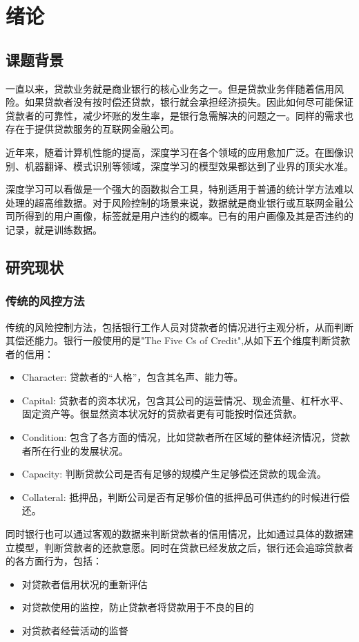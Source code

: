 \chapter{绪论}
\section{课题背景}
一直以来，贷款业务就是商业银行的核心业务之一。但是贷款业务伴随着信用风险。如果贷款者没有按时偿还贷款，银行就会承担经济损失。因此如何尽可能保证贷款者的可靠性，减少坏账的发生率，是银行急需解决的问题之一。同样的需求也存在于提供贷款服务的互联网金融公司。

近年来，随着计算机性能的提高，深度学习在各个领域的应用愈加广泛。在图像识别、机器翻译、模式识别等领域，深度学习的模型效果都达到了业界的顶尖水准\cite{lecun2015deep}。

深度学习可以看做是一个强大的函数拟合工具，特别适用于普通的统计学方法难以处理的超高维数据。对于风险控制的场景来说，数据就是商业银行或互联网金融公司所得到的用户画像，标签就是用户违约的概率。已有的用户画像及其是否违约的记录，就是训练数据。


\section{研究现状}
\subsection{传统的风控方法}
传统的风险控制方法，包括银行工作人员对贷款者的情况进行主观分析，从而判断其偿还能力。银行一般使用的是"The Five Cs of Credit"\cite[122]{apostolik2009foundations},从如下五个维度判断贷款者的信用：
\begin{itemize}
	\item Character: 贷款者的“人格”，包含其名声、能力等。
	\item Capital: 贷款者的资本状况，包含其公司的运营情况、现金流量、杠杆水平、固定资产等。很显然资本状况好的贷款者更有可能按时偿还贷款。
	\item Condition: 包含了各方面的情况，比如贷款者所在区域的整体经济情况，贷款者所在行业的发展状况。
	\item Capacity: 判断贷款公司是否有足够的规模产生足够偿还贷款的现金流。
	\item Collateral: 抵押品，判断公司是否有足够价值的抵押品可供违约的时候进行偿还。
\end{itemize}
同时银行也可以通过客观的数据来判断贷款者的信用情况，比如通过具体的数据建立模型，判断贷款者的还款意愿。同时在贷款已经发放之后，银行还会追踪贷款者的各方面行为，包括：
\begin{itemize}
	\item 对贷款者信用状况的重新评估
	\item 对贷款使用的监控，防止贷款者将贷款用于不良的目的
	\item 对贷款者经营活动的监督
\end{itemize}
